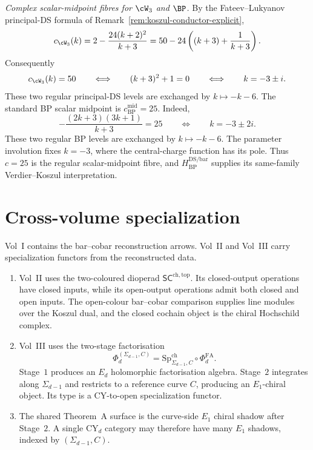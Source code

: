 \begin{remark}
\emph{Complex scalar-midpoint fibres for $\cW_3$ and $\BP$.}
By the Fateev--Lukyanov principal-DS formula of
Remark~\ref{rem:koszul-conductor-explicit},
\[
c_{\cW_3}(k)
=2-\frac{24(k+2)^2}{k+3}
=50-24\left((k+3)+\frac{1}{k+3}\right).
\]
Consequently
\[
c_{\cW_3}(k)=50
\qquad\Longleftrightarrow\qquad
(k+3)^2+1=0
\qquad\Longleftrightarrow\qquad
k=-3\pm i.
\]
These two regular principal-DS levels are exchanged by
$k\mapsto-k-6$.  The standard BP scalar midpoint is
$c^{\mathrm{mid}}_{\mathrm{BP}}=25$.
Indeed,
\[
-\frac{(2k+3)(3k+1)}{k+3}=25
\qquad\Longleftrightarrow\qquad
k=-3\pm2i.
\]
These two regular BP levels are exchanged by $k\mapsto-k-6$.
The parameter involution fixes $k=-3$, where the central-charge
function has its pole.  Thus $c=25$ is the regular scalar-midpoint
fibre, and $H_{\mathrm{BP}}^{\mathrm{DS/bar}}$ supplies its
same-family Verdier--Koszul interpretation.
\end{remark}

\section{Cross-volume specialization}
\label{sec:master-concordance-cross-volume}

Vol~I contains the bar--cobar reconstruction arrows.  Vol~II and
Vol~III carry specialization functors from the reconstructed data.

\begin{enumerate}[label=\textup{(\roman*)}]
\item Vol~II uses the two-coloured dioperad
$\mathsf{SC}^{\mathrm{ch,top}}$.  Its closed-output operations have
closed inputs, while its open-output operations admit both closed and
open inputs.  The open-colour bar--cobar comparison supplies line
modules over the Koszul dual, and the closed cochain object is the
chiral Hochschild complex.
\item Vol~III uses the two-stage factorisation
\[
\Phi_d^{(\Sigma_{d-1},C)}
=\mathrm{Sp}^{\mathrm{ch}}_{\Sigma_{d-1},C}
\circ\Phi_d^{\mathrm{FA}}.
\]
Stage~$1$ produces an $E_d$ holomorphic factorisation algebra.
Stage~$2$ integrates along $\Sigma_{d-1}$ and restricts to a reference
curve $C$, producing an $E_1$-chiral object.  Its type is a CY-to-open
specialization functor.
\item The shared Theorem~A surface is the curve-side $E_1$ chiral
shadow after Stage~$2$.  A single CY$_d$ category may therefore have
many $E_1$ shadows, indexed by $(\Sigma_{d-1},C)$.
\end{enumerate}

